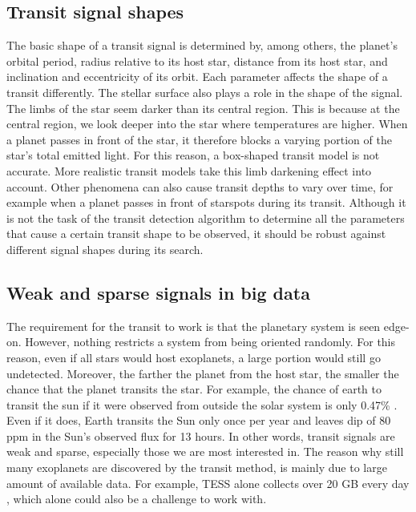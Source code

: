 \subsection{Transit signal shapes}
\label{sec:transit_shapes}

The basic shape of a transit signal is determined by, among others, the planet’s orbital period, radius relative to its host star, distance from its host star, and inclination and eccentricity of its orbit. Each parameter affects the shape of a transit differently. The stellar surface also plays a role in the shape of the signal. The limbs of the star seem darker than its central region. This is because at the central region, we look deeper into the star where temperatures are higher. When a planet passes in front of the star, it therefore blocks a varying portion of the star’s total emitted light. For this reason, a box-shaped transit model is not accurate. More realistic transit models take this limb darkening effect into account. Other phenomena can also cause transit depths to vary over time, for example when a planet passes in front of starspots during its transit. Although it is not the task of the transit detection algorithm to determine all the parameters that cause a certain transit shape to be observed, it should be robust against different signal shapes during its search.

\subsection{Weak and sparse signals in big data}

The requirement for the transit to work is that the planetary system is seen edge-on. However, nothing restricts a system from being oriented randomly. For this reason, even if all stars would host exoplanets, a large portion would still go undetected. Moreover, the farther the planet from the host star, the smaller the chance that the planet transits the star. For example, the chance of earth to transit the sun if it were observed from outside the solar system is only 0.47\% \citep{borucki1984photometric}. Even if it does, Earth transits the Sun only once per year and leaves dip of 80 ppm in the Sun’s observed flux for 13 hours. In other words, transit signals are weak and sparse, especially those we are most interested in. The reason why still many exoplanets are discovered by the transit method, is mainly due to large amount of available data. For example, TESS alone collects over 20 GB every day , which alone could also be a challenge to work with.

